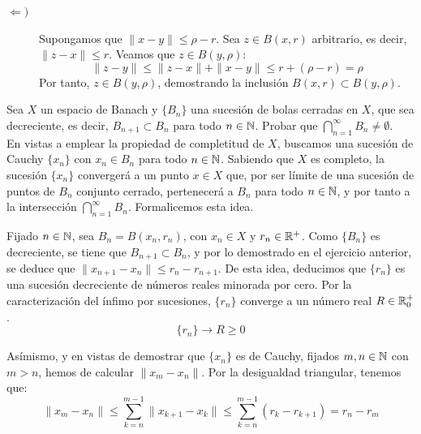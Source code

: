 \begin{ejercicio}
\begin{enumerate}[label={\alph*)}]
\begin{description}
        \item[$\Longleftarrow)$]
        Supongamos que $\|x - y\| \leq \rho - r$. Sea $z \in B(x, r)$ arbitrario, es decir, $\|z - x\| \leq r$. Veamos que $z \in B(y, \rho)$:
        \begin{equation*}
            \|z - y\| \leq \|z - x\| + \|x - y\| \leq r + (\rho - r) = \rho
        \end{equation*}
        Por tanto, $z \in B(y, \rho)$, demostrando la inclusión $B(x, r) \subset B(y, \rho)$.
    \end{description}
\end{enumerate}
\end{ejercicio}

\begin{ejercicio}
Sea $X$ un espacio de Banach y $\{B_n\}$ una sucesión de bolas cerradas en $X$, que sea decreciente, es decir, $B_{n+1} \subset B_n$ para todo $n \in \mathbb{N}$. Probar que $\bigcap\limits_{n=1}^\infty B_n \neq \emptyset$.\\

En vistas a emplear la propiedad de completitud de $X$, buscamos una sucesión de Cauchy $\{x_n\}$ con $x_n \in B_n$ para todo $n \in \mathbb{N}$. Sabiendo que $X$ es completo, la sucesión $\{x_n\}$ convergerá a un punto $x \in X$ que, por ser límite de una sucesión de puntos de $B_n$ conjunto cerrado, pertenecerá a $B_n$ para todo $n \in \mathbb{N}$, y por tanto a la intersección $\bigcap\limits_{n=1}^\infty B_n$. Formalicemos esta idea.

Fijado $n \in \mathbb{N}$, sea $B_n = B(x_n, r_n)$, con $x_n \in X$ y $r_n \in \mathbb{R}^+$. Como $\{B_n\}$ es decreciente, se tiene que $B_{n+1} \subset B_n$, y por lo demostrado en el ejercicio anterior, se deduce que $\|x_{n+1} - x_n\| \leq r_n - r_{n+1}$. De esta idea, deducimos que $\{r_n\}$ es una sucesión decreciente de números reales minorada por cero. Por la caracterización del ínfimo por sucesiones, $\{r_n\}$ converge a un número real $R\in \mathbb{R}^+_0$.
\begin{equation*}
    \{r_n\} \longrightarrow R \geq 0
\end{equation*}

Asímismo, y en vistas de demostrar que $\{x_n\}$ es de Cauchy, fijados $m, n \in \mathbb{N}$ con $m > n$, hemos de calcular $\|x_m - x_n\|$. Por la desigualdad triangular, tenemos que:
\begin{equation*}
    \|x_m - x_n\| \leq \sum_{k=n}^{m-1} \|x_{k+1} - x_k\| \leq \sum_{k=n}^{m-1} (r_k - r_{k+1}) = r_n - r_m
\end{equation*}


\end{ejercicio}
